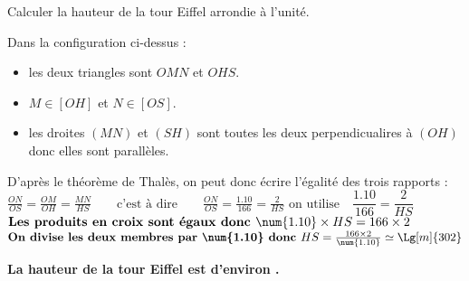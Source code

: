 \begin{corrige}
\begin{minipage}{0.55\linewidth}
        \medskip
        Calculer la hauteur de la tour Eiffel arrondie à l'unité.
    \end{minipage}

    \medskip
    {\color{red}
    Dans la configuration ci-dessus : 
    \begin{itemize}
        \item les deux triangles sont $OMN$ et $OHS$.
        \item $M \in [OH]$ et $N \in [OS]$.
        \item les droites $(MN)$ et $(SH)$ sont toutes les deux perpendicualires à $(OH)$        
        donc elles sont parallèles.                
    \end{itemize}
    D'après le théorème de Thalès, on peut donc écrire l'égalité des trois rapports :
        $\frac{ON}{OS}=\frac{OM}{OH}=\frac{MN}{HS}\qquad\mbox{c'est à dire}\qquad\frac{ON}{OS}=\frac{\num{1.10}}{166}=\frac{2}{HS}$
        $\mbox{on utilise} \quad \dfrac{\num{1.10}}{166}=\dfrac{2}{HS}$
        $\mbox{\bf Les produits en croix sont égaux donc }\num{1.10}\times HS=166\times 2$
        $\mbox{\bf On divise les deux membres par \num{1.10} donc }HS=\frac{166\times 2}{\num{1.10}}\simeq\Lg[m]{302}$
        
        \textbf{La hauteur de la tour Eiffel est d'environ .}
    }
\end{corrige}

